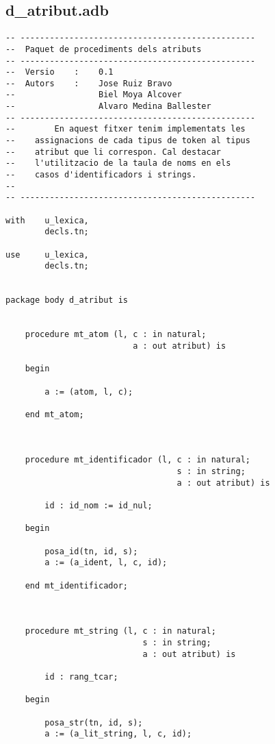 \documentclass[10pt]{report}
\begin{document}
    \newpage
    
    \subsection{d\_atribut.adb}
    \begin{lstlisting}[style=Ada]
-- ------------------------------------------------
--  Paquet de procediments dels atributs
-- ------------------------------------------------
--  Versio    :    0.1
--  Autors    :    Jose Ruiz Bravo
--                 Biel Moya Alcover
--                 Alvaro Medina Ballester
-- ------------------------------------------------
--        En aquest fitxer tenim implementats les 
--    assignacions de cada tipus de token al tipus
--    atribut que li correspon. Cal destacar 
--    l'utilitzacio de la taula de noms en els
--    casos d'identificadors i strings.
--
-- ------------------------------------------------

with    u_lexica,
        decls.tn;

use     u_lexica,
        decls.tn;
        

package body d_atribut is    
    
    
    procedure mt_atom (l, c : in natural; 
                          a : out atribut) is
    
    begin
    
        a := (atom, l, c);
        
    end mt_atom;
    
    
    
    procedure mt_identificador (l, c : in natural; 
                                   s : in string; 
                                   a : out atribut) is
    
        id : id_nom := id_nul;
        
    begin
    
        posa_id(tn, id, s);
        a := (a_ident, l, c, id);
        
    end mt_identificador;
    
    
    
    procedure mt_string (l, c : in natural; 
                            s : in string; 
                            a : out atribut) is
    
        id : rang_tcar;
        
    begin
    
        posa_str(tn, id, s);
        a := (a_lit_string, l, c, id);
        

\end{lstlisting}
\end{document}
